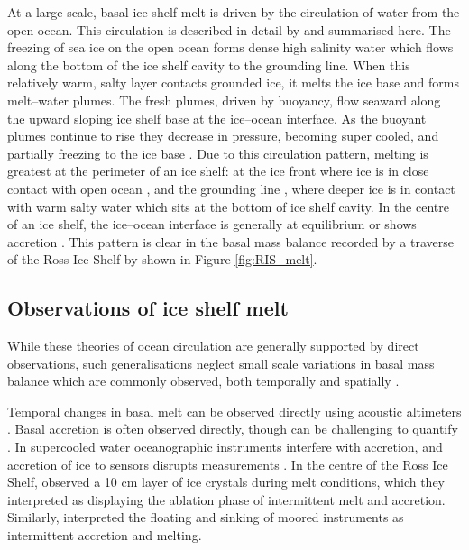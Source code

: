 
At a large scale, basal ice shelf melt is driven by the circulation of water from the open ocean. This circulation is described in detail by \cite{jacobs1992melting} and summarised here. The freezing of sea ice on the open ocean forms dense high salinity water which flows along the bottom of the ice shelf cavity to the grounding line. When this relatively warm, salty layer contacts grounded ice, it melts the ice base and forms melt--water plumes. The fresh plumes, driven by buoyancy, flow seaward along the upward sloping ice shelf base at the ice--ocean interface. As the buoyant plumes continue to rise they decrease in pressure, becoming super cooled, and partially freezing to the ice base \citep{lewis1986ice}.  
Due to this circulation pattern, melting is greatest at the perimeter of an ice shelf: at the ice front where ice is in close contact with open ocean \citep[e.g.][] {goldberg2019accurately}, and the grounding line \citep[e.g.][] {mankoff2012role}, where deeper ice is in contact with warm salty water which sits at the bottom of ice shelf cavity. In the centre of an ice shelf, the ice--ocean interface is generally at equilibrium or shows accretion \citep[e.g.][] {rignot2013ice}. This pattern is clear in the basal mass balance recorded by a traverse of the Ross Ice Shelf by \cite{snodgrass2021melting} shown in Figure \ref{fig:RIS_melt}.

\subsection{Observations of ice shelf melt}
While these theories of ocean circulation are generally supported by direct observations, such generalisations neglect small scale variations in basal mass balance which are commonly observed, both temporally \citep[e.g.][]{stewart2018ice} and spatially \citep[e.g.][]{marsh2016high}.


Temporal changes in basal melt can be observed directly using acoustic altimeters \citep[e.g.][]{stewart2018ice}. Basal accretion is often observed directly, though can be challenging to quantify \citep{vavnkova2020observations}. In supercooled water oceanographic instruments interfere with accretion, and accretion of ice to sensors disrupts measurements \citep{robinson2020ice}.   In the centre of the Ross Ice Shelf, \cite{stevens2020ocean} observed a 10 cm layer of ice crystals during melt conditions, which they interpreted as displaying the ablation phase of intermittent melt and accretion.  Similarly, \cite{craven2014platelet} interpreted the floating and sinking of moored instruments as intermittent accretion and melting.

